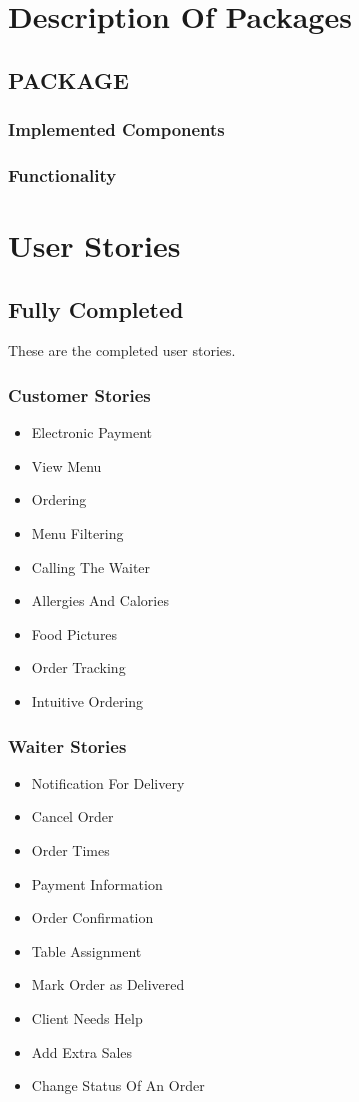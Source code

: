 \documentclass[12pt, twoside, a4paper]{report}
\begin{document}
\section*{Description Of Packages}
\subsection*{PACKAGE}
\subsubsection*{Implemented Components}
\subsubsection*{Functionality}

\section*{User Stories}
\subsection*{Fully Completed}
These are the completed user stories.
\subsubsection*{Customer Stories}
\begin{itemize}
  \item Electronic Payment
  \item View Menu
  \item Ordering
  \item Menu Filtering
  \item Calling The Waiter
  \item Allergies And Calories
  \item Food Pictures
  \item Order Tracking
  \item Intuitive Ordering
\end{itemize}

\subsubsection*{Waiter Stories}
\begin{itemize}
  \item Notification For Delivery
  \item Cancel Order
  \item Order Times
  \item Payment Information
  \item Order Confirmation
  \item Table Assignment
  \item Mark Order as Delivered
  \item Client Needs Help
  \item Add Extra Sales
  \item Change Status Of An Order
\end{itemize}
\end{document}
